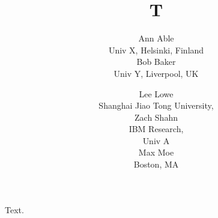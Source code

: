 \documentclass{article}
\begin{document}
\title{T}
\author{Ann Able\\
Univ X, Helsinki, Finland \\
Bob Baker\\
Univ Y, Liverpool, UK
\and Lee Lowe \\
Shanghai Jiao Tong University, \\
Zach Shahn \\
IBM Research, \\
Univ A \\[-2pt]
Max Moe \\
Boston, MA}
\maketitle
Text.
\end{document}
